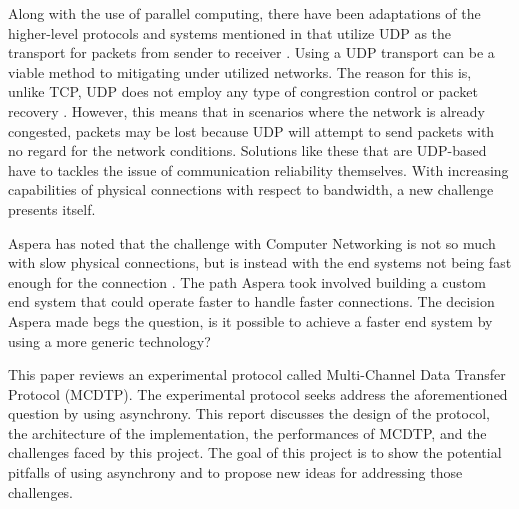 Along with the use of parallel computing, there have been adaptations of the higher-level protocols and systems mentioned in \cite{Fan2010} that utilize UDP as the transport for packets from sender to receiver \cite{He2002}\cite{Aspera2016}\cite{Fan2010}\cite{Meiss2007}\cite{gu2007udt}. Using a UDP transport can be a viable method to mitigating under utilized networks. The reason for this is, unlike TCP, UDP does not employ any type of congrestion control or packet recovery \cite{postel1980user}. However, this means that in scenarios where the network is already congested, packets may be lost because UDP will attempt to send packets with no regard for the network conditions. Solutions like these that are UDP-based have to tackles the issue of communication reliability themselves. With increasing capabilities of physical connections with respect to bandwidth, a new challenge presents itself.

Aspera has noted that the challenge with Computer Networking is not so much with slow physical connections, but is instead with the end systems not being fast enough for the connection \cite{Aspera2016}\cite{Fan2010}. The path Aspera took involved building a custom end system that could operate faster to handle faster connections. The decision Aspera made begs the question, is it possible to achieve a faster end system by using a more generic technology?

This paper reviews an experimental protocol called Multi-Channel Data Transfer Protocol (MCDTP). The experimental protocol seeks address the aforementioned question by using asynchrony. This report discusses the design of the protocol, the architecture of the implementation, the performances of MCDTP, and the challenges faced by this project. The goal of this project is to show the potential pitfalls of using asynchrony and to propose new ideas for addressing those challenges.
